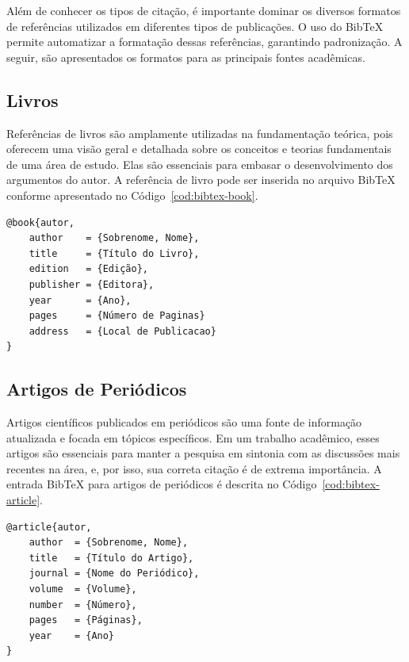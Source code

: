 Além de conhecer os tipos de citação, é importante dominar os diversos formatos de referências utilizados em diferentes tipos de publicações. O uso do BibTeX permite automatizar a formatação dessas referências, garantindo padronização. A seguir, são apresentados os formatos para as principais fontes acadêmicas.

\subsection{Livros}

Referências de livros são amplamente utilizadas na fundamentação teórica, pois oferecem uma visão geral e detalhada sobre os conceitos e teorias fundamentais de uma área de estudo. Elas são essenciais para embasar o desenvolvimento dos argumentos do autor. A referência de livro pode ser inserida no arquivo BibTeX conforme apresentado no Código~\ref{cod:bibtex-book}.

\begin{codigo}[htb]
\begin{lstlisting}
@book{autor,
    author    = {Sobrenome, Nome},
    title     = {Título do Livro},
    edition   = {Edição},
    publisher = {Editora},
    year      = {Ano},
    pages     = {Número de Paginas}
    address   = {Local de Publicacao}
}
\end{lstlisting}
\fonteautor
\end{codigo}

\subsection{Artigos de Periódicos}

Artigos científicos publicados em periódicos são uma fonte de informação atualizada e focada em tópicos específicos. Em um trabalho acadêmico, esses artigos são essenciais para manter a pesquisa em sintonia com as discussões mais recentes na área, e, por isso, sua correta citação é de extrema importância. A entrada BibTeX para artigos de periódicos é descrita no Código~\ref{cod:bibtex-article}.

\begin{codigo}[htb]
\begin{lstlisting}
@article{autor,
    author  = {Sobrenome, Nome},
    title   = {Título do Artigo},
    journal = {Nome do Periódico},
    volume  = {Volume},
    number  = {Número},
    pages   = {Páginas},
    year    = {Ano}
}
\end{lstlisting}
\fonteautor
\end{codigo}

